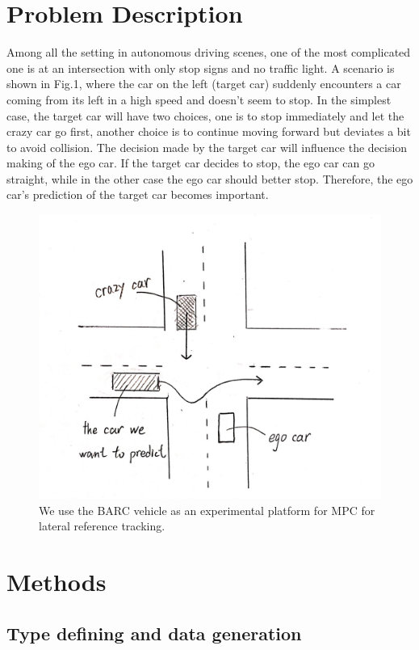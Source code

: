 \documentclass[conference]{IEEEtran}
\begin{document}
\section{Problem Description}
Among all the setting in autonomous driving scenes, one of the most complicated one is at an intersection with only stop signs and no traffic light. A scenario is shown in Fig.1, where the car on the left (target car) suddenly encounters a car coming from its left in a high speed and doesn't seem to stop. In the simplest case, the target car will have two choices, one is to stop immediately and let the crazy car go first, another choice is to continue moving forward but deviates a bit to avoid collision. The decision made by the target car will influence the decision making of the ego car. If the target car decides to stop, the ego car can go straight, while in the other case the ego car should better stop. Therefore, the ego car's prediction of the target car becomes important.
\begin{figure}[h!]
\centering
\includegraphics[scale = 0.1]{problem.png}
\caption{We use the BARC vehicle as an experimental platform for MPC for lateral reference tracking.}
\label{fig:reftraj}
\end{figure}

\section{Methods}

\subsection{Type defining and data generation}
\end{document}
